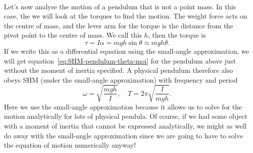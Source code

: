 \documentclass[../classical_mechanics.tex]{subfiles}
\begin{document}
        \paragraph{}
        Let's now analyse the motion of a pendulum that is not a point mass.
        In this case, the we will look at the torques to find the motion.
        The weight force acts on the centre of mass, and the lever arm for the torque is the distance from the pivot point to the centre of mass.
        We call this $h$, then the torque is
        \begin{equation}
            \tau=I\alpha=mgh\sin\theta\approx mgh\theta.
        \end{equation}
        If we write this as a differential equation using the small-angle approximation, we will get equation~\ref{eq:SHM-pendulum-theta-moi} for the pendulum above just without the moment of inertia specified.
        A physical pendulum therefore also obeys SHM (under the small-angle approximation) with frequency and period
        \begin{equation}\label{eq:SHM-physical-pendulum-frequency}
            \omega=\sqrt{\frac{mgh}{I}},\quad T=2\pi\sqrt{\frac{I}{mgh}}.
        \end{equation}
        Here we use the small-angle approximation because it allows us to solve for the motion analytically for lots of physical pendula.
        Of course, if we had some object with a moment of inertia that cannot be expressed analytically, we might as well do away with the small-angle approximation since we are going to have to solve the equation of motion numerically anyway!
\end{document}
